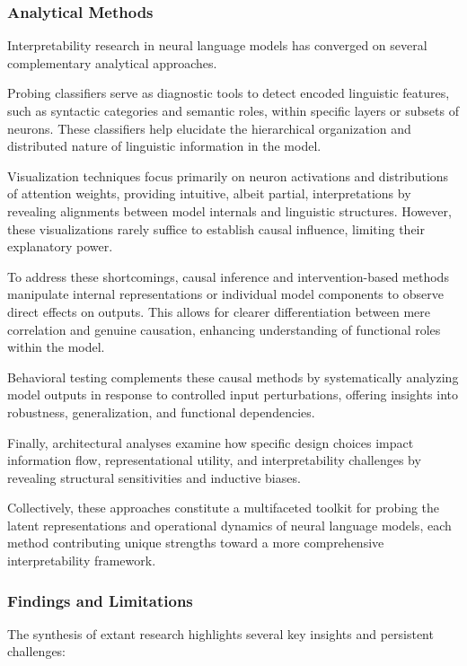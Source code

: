 \documentclass[sigconf]{acmart}
\begin{document}
\subsubsection{Analytical Methods}

Interpretability research in neural language models has converged on several complementary analytical approaches.

Probing classifiers serve as diagnostic tools to detect encoded linguistic features, such as syntactic categories and semantic roles, within specific layers or subsets of neurons. These classifiers help elucidate the hierarchical organization and distributed nature of linguistic information in the model.

Visualization techniques focus primarily on neuron activations and distributions of attention weights, providing intuitive, albeit partial, interpretations by revealing alignments between model internals and linguistic structures. However, these visualizations rarely suffice to establish causal influence, limiting their explanatory power.

To address these shortcomings, causal inference and intervention-based methods manipulate internal representations or individual model components to observe direct effects on outputs. This allows for clearer differentiation between mere correlation and genuine causation, enhancing understanding of functional roles within the model.

Behavioral testing complements these causal methods by systematically analyzing model outputs in response to controlled input perturbations, offering insights into robustness, generalization, and functional dependencies.

Finally, architectural analyses examine how specific design choices impact information flow, representational utility, and interpretability challenges by revealing structural sensitivities and inductive biases.

Collectively, these approaches constitute a multifaceted toolkit for probing the latent representations and operational dynamics of neural language models, each method contributing unique strengths toward a more comprehensive interpretability framework.

\subsubsection{Findings and Limitations}

The synthesis of extant research highlights several key insights and persistent challenges:
\end{document}

